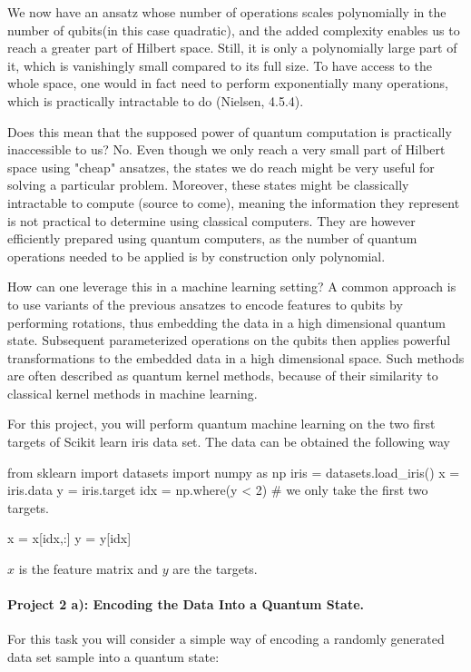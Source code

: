 \documentclass[%
oneside,                 %
final,                   %
10pt]{article}
\begin{document}
We now have an ansatz whose number of operations scales polynomially in the number of qubits(in this case quadratic), and the
added complexity enables us to reach a greater part of Hilbert space. Still, it is only a polynomially large part of it, which
is vanishingly small compared to its full size. To have access to the whole space, one would in fact need to perform exponentially
many operations, which is practically intractable to do (Nielsen, 4.5.4).

Does this mean that the supposed power of quantum computation is practically inaccessible to us? No. Even though we
only reach a very small part of Hilbert space using "cheap" ansatzes, the states we do reach might be very useful
for solving a particular problem. Moreover, these states might be classically intractable to compute (source to come),
meaning the information they represent is not practical to determine using classical computers. They are however efficiently
prepared using quantum computers, as the number of quantum operations needed to be applied is by construction only polynomial.

How can one leverage this in a machine learning setting? A common approach is to use variants of the previous ansatzes to encode features to qubits by performing rotations, thus embedding the data in a high dimensional quantum state. Subsequent parameterized operations on the qubits then applies powerful transformations to the embedded data in a high dimensional space. Such methods are often described as quantum kernel methods, because of their similarity to classical kernel methods in machine learning.

For this project, you will perform quantum machine learning on the two first targets of Scikit learn iris data set. The data can be obtained the following way

\begin{print}
from sklearn import datasets
import numpy as np
iris = datasets.load_iris()
x = iris.data
y = iris.target
idx = np.where(y < 2) # we only take the first two targets.

x = x[idx,:]
y = y[idx]
\end{print}
$x$ is the feature matrix and $y$ are the targets.

\paragraph{Project 2 a): Encoding the Data Into a Quantum State.}
For this task you will consider a simple way of encoding a randomly generated data set sample into a quantum state:
\end{document}
